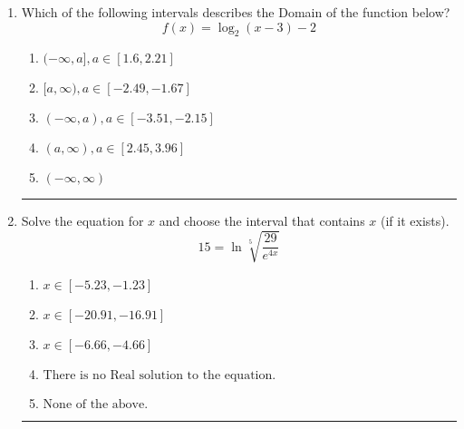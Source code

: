 \documentclass[14pt]{extbook}
\newcommand{\litem}[1]{\item#1\hspace*{-1cm}\rule{\textwidth}{0.4pt}}
\begin{document}
\begin{enumerate}
{\begin{enumerate}[label=\Alph*.]
\end{enumerate} }
\litem{
Which of the following intervals describes the Domain of the function below?\[ f(x) = \log_2{(x-3)}-2 \]\begin{enumerate}[label=\Alph*.]
\item \( (-\infty, a], a \in [1.6, 2.21] \)
\item \( [a, \infty), a \in [-2.49, -1.67] \)
\item \( (-\infty, a), a \in [-3.51, -2.15] \)
\item \( (a, \infty), a \in [2.45, 3.96] \)
\item \( (-\infty, \infty) \)

\end{enumerate} }
\litem{
 Solve the equation for $x$ and choose the interval that contains $x$ (if it exists).\[  15 = \ln{\sqrt[5]{\frac{29}{e^{4x}}}} \]\begin{enumerate}[label=\Alph*.]
\item \( x \in [-5.23, -1.23] \)
\item \( x \in [-20.91, -16.91] \)
\item \( x \in [-6.66, -4.66] \)
\item \( \text{There is no Real solution to the equation.} \)
\item \( \text{None of the above.} \)

\end{enumerate} }
\end{enumerate}
\end{document}
